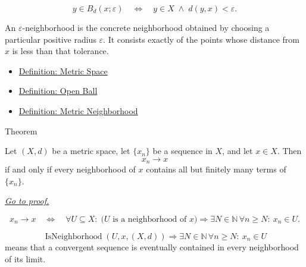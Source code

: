 \begin{remark*}
\[
y\in B_d(x;\varepsilon)
\quad\Longleftrightarrow\quad
y\in X\;\land\; d(y,x)<\varepsilon.
\]
\end{remark*}

\begin{remark*}[Interpretation]
An \(\varepsilon\)-neighborhood is the concrete neighborhood obtained by
choosing a particular positive radius \(\varepsilon\).  It consists exactly of
the points whose distance from \(x\) is less than that tolerance.
\end{remark*}

\begin{dependencies}
\begin{itemize}
  \item \hyperref[def:metric-space]{Definition: Metric Space}
  \item \hyperref[def:metric-open-ball]{Definition: Open Ball}
  \item \hyperref[def:metric-neighborhood]{Definition: Metric Neighborhood}
\end{itemize}
\end{dependencies}

\begin{theorembox}{Theorem}
\begin{theorem}
\label{thm:metric-neighborhood-criterion-sequential-convergence}
Let \((X,d)\) be a metric space, let \(\{x_n\}\) be a sequence in \(X\), and
let \(x\in X\).  Then
\[
  x_n\to x
\]
if and only if every neighborhood of \(x\) contains all but finitely many terms
of \(\{x_n\}\).

\smallskip
\noindent
\hyperref[prf:metric-neighborhood-criterion-sequential-convergence]{\textit{Go to proof.}}
\end{theorem}
\end{theorembox}

\begin{remark*}
\[
x_n\to x
\quad\Longleftrightarrow\quad
\forall U\subseteq X{:}\;
\bigl(U\text{ is a neighborhood of }x\bigr)
\Longrightarrow
\exists N\in\mathbb{N}\,\forall n\geq N{:}\ x_n\in U.
\]
\end{remark*}

\begin{remark*}
\[
\operatorname{IsNeighborhood}(U,x,(X,d))
\Longrightarrow
\exists N\in\mathbb{N}\,\forall n\geq N{:}\ x_n\in U
\]
means that a convergent sequence is eventually contained in every
neighborhood of its limit.
\end{remark*}

